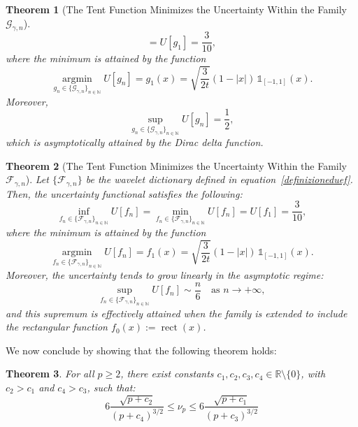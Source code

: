 \documentclass[preprint,hidelinks,authoryear]{elsarticle}
\newtheorem{Thm}{Theorem}[section]
\theoremstyle{plain}
\theoremstyle{definition}
\theoremstyle{remark}
\begin{document}
{\begin{Thm}[The Tent Function Minimizes the Uncertainty Within the Family $\mathcal{G}_{\gamma,n}$]
\begin{equation}
= U[g_1] = \frac{3}{10},
\label{infètriangolo1}
\end{equation}
where the minimum is attained by the function
\begin{equation}
\operatorname*{argmin}_{g_n \in \{\mathcal{G}_{\gamma,n}\}_{n \in \mathbb{N}}} U[g_n] 
= g_1(x) = \sqrt{\frac{3}{2t}} \left(1 - |x| \right) \, \mathds{1}_{[-1,1]}(x).
\end{equation}
Moreover,
\begin{equation}
\sup_{g_n \in \{\mathcal{G}_{\gamma,n}\}_{n \in \mathbb{N}}} U[g_n] = \frac{1}{2},
\label{supètriangolo1}
\end{equation}
which is asymptotically attained by the Dirac delta function.
\end{Thm}
\begin{Thm}[The Tent Function Minimizes the Uncertainty Within the Family $\mathcal{F}_{\gamma,n}$]
\label{th:tent2}
Let $ \{\mathcal{F}_{\gamma,n}\} $ be the wavelet dictionary defined in equation~\eqref{definizioneduef}.
Then, the uncertainty functional satisfies the following:
\begin{equation}
\inf_{f_n \in \{\mathcal{F}_{\gamma,n}\}_{n \in \mathbb{N}}} U[f_n] = \min_{f_n \in \{\mathcal{F}_{\gamma,n}\}_{n \in \mathbb{N}}} U[f_n] = U[f_1] = \frac{3}{10},
\label{infètriangolo1}
\end{equation}
where the minimum is attained by the function
\begin{equation}
\operatorname*{argmin}_{f_n \in \{\mathcal{F}_{\gamma,n}\}_{n \in \mathbb{N}}} U[f_n] = f_1(x) = \sqrt{\frac{3}{2t}} \left(1 - |x| \right) \, \mathds{1}_{[-1,1]}(x).
\end{equation}
Moreover, the uncertainty tends to grow linearly in the asymptotic regime:
\begin{equation}
\sup_{f_n \in \{\mathcal{F}_{\gamma,n}\}_{n \in \mathbb{N}}} U[f_n] \sim \frac{n}{6}\quad \text{as } n \to +\infty,
\label{supètriangolo2}
\end{equation}
and this supremum is effectively attained when the family is extended to include the rectangular function $ f_0(x) := \operatorname{rect}(x) $.
\end{Thm}
We now conclude by showing that the following theorem holds:
\begin{Thm}
\label{th:Urectp}
For all $p \ge 2$, there exist constants $c_1, c_2, c_3, c_4 \in \mathbb{R} \setminus \{0\}$, with $c_2 > c_1$ and $c_4 > c_3$, such that:
\begin{equation}
6\frac{\sqrt{p + c_2}}{(p + c_4)^{3/2}} \le \nu_p \le 6\frac{\sqrt{p + c_1}}{(p + c_3)^{3/2}} \label{disrapportofrequenze}

\end{equation}
\end{Thm}}
\end{document}
